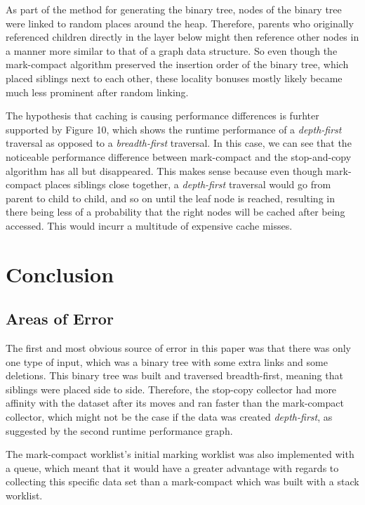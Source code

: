 \documentclass[index]{subfiles}
\begin{document}
As part of the method for generating the binary tree, nodes of the binary tree were linked to random places around the heap. Therefore, parents who originally referenced children directly in the layer below might then reference other nodes in a manner more similar to that of a graph data structure. So even though the mark-compact algorithm preserved the insertion order of the binary tree, which placed siblings next to each other, these locality bonuses mostly likely became much less prominent after random linking.

The hypothesis that caching is causing performance differences is furhter supported by Figure 10, which shows the runtime performance of a \textit{depth-first} traversal as opposed to a \textit{breadth-first} traversal. In this case, we can see that the noticeable performance difference between mark-compact and the stop-and-copy algorithm has all but disappeared. This makes sense because even though mark-compact places siblings close together, a \textit{depth-first} traversal would go from parent to child to child, and so on until the leaf node is reached, resulting in there being less of a probability that the right nodes will be cached after being accessed. This would incurr a multitude of expensive cache misses.

\section{Conclusion}

\subsection{Areas of Error}

The first and most obvious source of error in this paper was that there was only one type of input, which was a binary tree with some extra links and some deletions. This binary tree was built and traversed breadth-first, meaning that siblings were placed side to side. Therefore, the stop-copy collector had more affinity with the dataset after its moves and ran faster than the mark-compact collector, which might not be the case if the data was created \textit{depth-first}, as suggested by the second runtime performance graph.

The mark-compact worklist's initial marking worklist was also implemented with a queue, which meant that it would have a greater advantage with regards to collecting this specific data set than a mark-compact which was built with a stack worklist.
\end{document}

